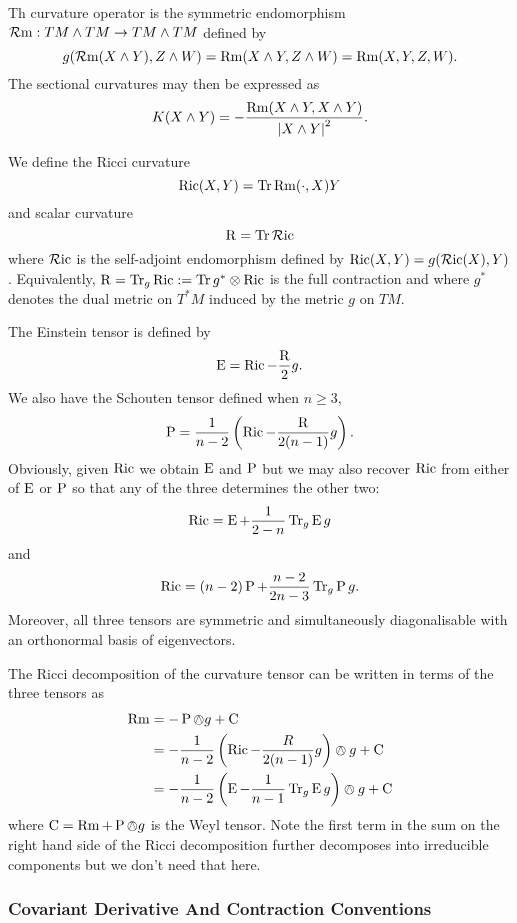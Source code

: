 \documentclass[a4paper, 12pt]{amsart}
\begin{document}
Th curvature operator is the symmetric endomorphism \(\operatorname{\mathcal{R}m} : TM \wedge TM \to TM \wedge TM\) defined by
\[
g(\operatorname{\mathcal{R}m}(X\wedge Y), Z \wedge W) = \operatorname{Rm}(X\wedge Y, Z \wedge W) = \operatorname{Rm}(X, Y, Z, W).
\]
The sectional curvatures may then be expressed as
\[
K(X \wedge Y) = -\frac{\operatorname{Rm}(X \wedge Y, X \wedge Y)}{\left\lvert{X \wedge Y}\right\rvert^2}.
\]

We define the Ricci curvature
\[
\operatorname{Ric}(X, Y) = \operatorname{Tr} \operatorname{Rm}(\cdot, X) Y
\]
and scalar curvature
\[
\operatorname{R} = \operatorname{Tr} \operatorname{\mathcal{R}ic}
\]
where \(\operatorname{\mathcal{R}ic}\) is the self-adjoint endomorphism defined by \(\operatorname{Ric}(X, Y) = g(\operatorname{\mathcal{R}ic}(X), Y)\). Equivalently, \(\operatorname{R} = \operatorname{Tr}_g \operatorname{Ric} := \operatorname{Tr} g^{\ast} \otimes \operatorname{Ric}\) is the full contraction and where \(g^{\ast}\) denotes the dual metric on \(T^{\ast}M\) induced by the metric \(g\) on \(TM\).

The Einstein tensor is defined by
\[
\operatorname{E} = \operatorname{Ric} - \frac{\operatorname{R}}{2} g.
\]
We also have the Schouten tensor defined when \(n \geq 3\),
\[
\operatorname{P} = \frac{1}{n-2} \left(\operatorname{Ric} - \frac{\operatorname{R}}{2(n-1)}g \right).
\]
Obviously, given \(\operatorname{Ric}\) we obtain \(\operatorname{E}\) and \(\operatorname{P}\) but we may also recover \(\operatorname{Ric}\) from either of \(\operatorname{E}\) or \(\operatorname{P}\) so that any of the three determines the other two:
\[
\operatorname{Ric} = \operatorname{E} + \frac{1}{2-n} \operatorname{Tr}_g \operatorname{E} g
\]
and
\[
\operatorname{Ric} = (n-2) \operatorname{P} + \frac{n-2}{2n-3} \operatorname{Tr}_g \operatorname{P} g.
\]
Moreover, all three tensors are symmetric and simultaneously diagonalisable with an orthonormal basis of eigenvectors.

The Ricci decomposition of the curvature tensor can be written in terms of the three tensors as
\begin{align*}
\operatorname{Rm} &= -\operatorname{P} \owedge g + \operatorname{C} \\
&= -\frac{1}{n-2} \left(\operatorname{Ric} - \frac{R}{2(n-1)} g\right) \owedge g + \operatorname{C} \\
&= -\frac{1}{n-2} \left(\operatorname{E}  -\frac{1}{n-1} \operatorname{Tr}_g \operatorname{E} g\right) \owedge g + \operatorname{C}
\end{align*}
where \(\operatorname{C} = \operatorname{Rm} + \operatorname{P} \owedge g\) is the Weyl tensor. Note the first term in the sum on the right hand side of the Ricci decomposition further decomposes into irreducible components but we don't need that here.

\subsubsection{Covariant Derivative And Contraction Conventions}
\label{subsubsec:notation_intrinsic_covariant}
\end{document}
